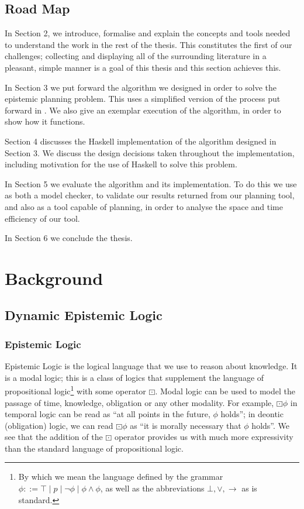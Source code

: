 \documentclass[10pt, a4paper]{report}
\begin{document}
\section{Road Map}

In Section 2, we introduce, formalise and explain the concepts and tools needed
to understand the work in the rest of the thesis. This constitutes the first of
our challenges; collecting and displaying all of the surrounding literature in a
pleasant, simple manner is a goal of this thesis and this section achieves this.

In Section 3 we put forward the algorithm we designed in order to solve the
epistemic planning problem. This uses a simplified version of the process put
forward in . We also give an exemplar execution of
the algorithm, in order to show how it functions.

Section 4 discusses the Haskell implementation of the algorithm designed in
Section 3. We discuss the design decisions taken throughout the implementation,
including motivation for the use of Haskell to solve this problem.

In Section 5 we evaluate the algorithm and its implementation. To do this we
use \cite{GithubGossip} as both a model checker, to validate our results
returned from our planning tool, and also as a tool capable of planning, in
order to analyse the space and time efficiency of our tool. 

In Section 6 we conclude the thesis. 

\newpage

\chapter{Background}

\section{Dynamic Epistemic Logic}
\label{sec:DEL}

\subsection{Epistemic Logic}

Epistemic Logic is the logical language that we use to reason about knowledge.
It is a modal logic; this is a class of logics that supplement the language of
propositional logic\footnote{By which we mean the language defined by the
  grammar $\phi ::= \top \mid p \mid \neg \phi \mid \phi \land \phi$, as well as
  the abbreviations $\bot, \lor, \rightarrow$ as is standard.} with some operator
$\boxdot$. Modal logic can be used to model the passage of time, knowledge,
obligation or any other modality. For example, $\boxdot \phi$ in temporal logic
can be read as ``at all points in the future, $\phi$ holds''; in deontic
(obligation) logic, we can read $\boxdot \phi$ as ``it is morally necessary that
$\phi$ holds''. We see that the addition of the $\boxdot$ operator provides us
with much more expressivity than the standard language of propositional logic.
\end{document}
